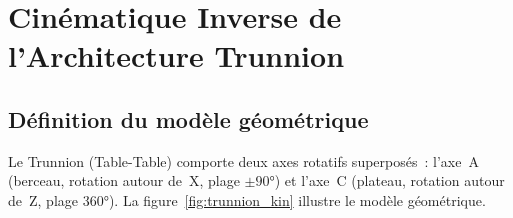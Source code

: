 \documentclass[12pt,a4paper]{report}
\begin{document}
\section{Cinématique Inverse de l'Architecture Trunnion}

\subsection{Définition du modèle géométrique}

Le Trunnion (Table-Table) comporte deux axes rotatifs superposés~: l'axe~A (berceau, rotation autour de~X, plage $\pm 90°$) et l'axe~C (plateau, rotation autour de~Z, plage $360°$). La figure~\ref{fig:trunnion_kin} illustre le modèle géométrique.
\end{document}
